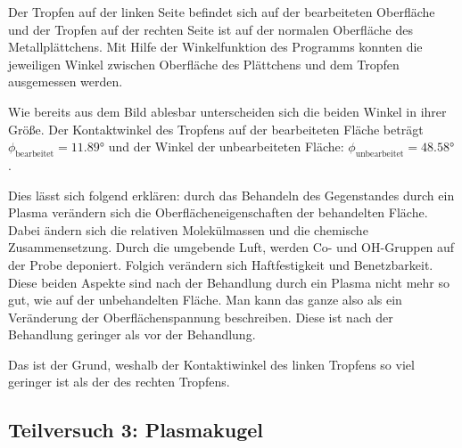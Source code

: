 \documentclass{article}
\begin{document}
Der Tropfen auf der linken Seite befindet sich auf der bearbeiteten Oberfläche und der Tropfen auf der rechten Seite ist auf der normalen Oberfläche des Metallplättchens. Mit Hilfe der Winkelfunktion des Programms konnten die jeweiligen Winkel zwischen Oberfläche des Plättchens und dem Tropfen ausgemessen werden.

Wie bereits aus dem Bild ablesbar unterscheiden sich die beiden Winkel in ihrer Größe. Der Kontaktwinkel des Tropfens auf der bearbeiteten Fläche beträgt $\phi_\text{bearbeitet}=\ang{11.89}$ und der Winkel der unbearbeiteten Fläche: $\phi_\text{unbearbeitet}=\ang{48.58}$.

Dies lässt sich folgend erklären: durch das Behandeln des Gegenstandes durch ein Plasma verändern sich die Oberflächeneigenschaften der behandelten Fläche. Dabei ändern sich die relativen Molekülmassen und die chemische Zusammensetzung. Durch die umgebende Luft, werden Co- und OH-Gruppen auf der Probe deponiert. Folgich verändern sich Haftfestigkeit und Benetzbarkeit. Diese beiden Aspekte sind nach der Behandlung durch ein Plasma nicht mehr so gut, wie auf der unbehandelten Fläche. Man kann das ganze also als ein Veränderung der Oberflächenspannung beschreiben. Diese ist nach der Behandlung geringer als vor der Behandlung.

Das ist der Grund, weshalb der Kontaktiwinkel des linken Tropfens so viel geringer ist als der des rechten Tropfens.

\newpage

\subsection{Teilversuch 3: Plasmakugel}
\end{document}
